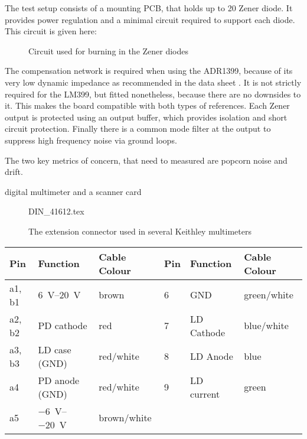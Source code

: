 The test setup consists of a mounting PCB, that holds up to 20 Zener diode. It provides power regulation and a minimal circuit required to support each diode. This circuit is given here:

\begin{figure}[ht]
    \centering
    \caption{Circuit used for burning in the Zener diodes}
\end{figure}

The compensation network is required when using the ADR1399, because of its very low dynamic impedance as recommended in the data sheet \cite{datasheet_ADR1399}. It is not strictly required for the LM399, but fitted nonetheless, because there are no downsides to it. This makes the board compatible with both types of references. Each Zener output is protected using an output buffer, which provides isolation and short circuit protection. Finally there is a common mode filter at the output to suppress high frequency noise via ground loops.

The two key metrics of concern, that need to measured are popcorn noise and drift.

digital multimeter and a scanner card


\begin{figure}[ht]
    \centering
    {DIN_41612.tex}
    \caption{The extension connector used in several Keithley multimeters}
\end{figure}

\begin{table}[ht]
    \centering
    \begin{tabular}{llllll}
        \toprule
        Pin    & Function    & Cable Colour    & Pin    & Function    &  Cable Colour\\
        \midrule
        a1, b1    & \SIrange[print-implicit-plus=true]{6}{20}{\volt}    & brown    & \num{6}    & GND    & green/white\\
        a2, b2    & PD cathode    & red    & \num{7}    & LD Cathode    & blue/white\\
        a3, b3    & LD case (GND)    & red/white    & \num{8}    & LD Anode    & blue\\
        a4    & PD anode (GND)    & red/white    & \num{9}    & LD current    & green\\
        a5    & \SIrange{-6}{-20}{\volt}    & brown/white\\
        \bottomrule
    \end{tabular}
\end{table}

